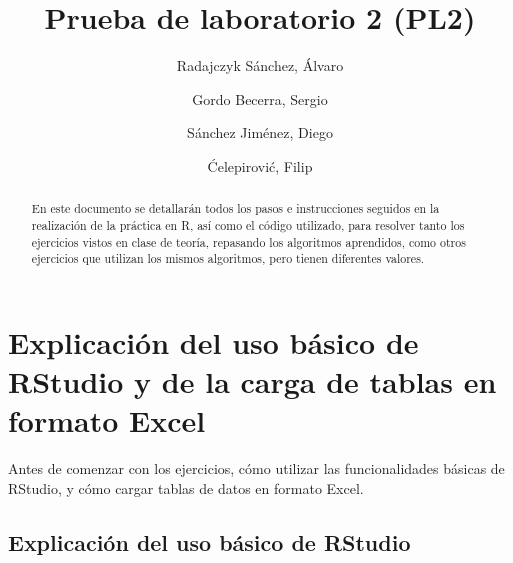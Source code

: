 \documentclass[parskip=full]{scrartcl}
\title{Prueba de laboratorio 2 (PL2)}
\author{
  Radajczyk Sánchez, Álvaro
  \and
  Gordo Becerra, Sergio
  \and
  Sánchez Jiménez, Diego
  \and
  Ćelepirović, Filip
}
\begin{document}
\maketitle

\begin{abstract}

En este documento se detallarán todos los pasos e instrucciones seguidos en la realización de la práctica en R, así como el código utilizado, para resolver tanto los ejercicios vistos en clase de teoría, repasando los algoritmos aprendidos, como otros ejercicios que utilizan los mismos algoritmos, pero tienen diferentes valores.

\end{abstract}

{
  \hypersetup{
    linkcolor=black,
    linktoc=all,
  }
  \tableofcontents
}

\section{Explicación del uso básico de RStudio y de la carga de tablas en formato Excel}

Antes de comenzar con los ejercicios, cómo utilizar las funcionalidades básicas de RStudio, y cómo cargar tablas de datos en formato Excel.

\subsection{Explicación del uso básico de RStudio}
\end{document}
